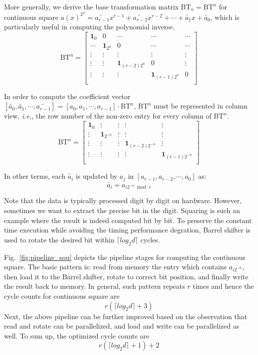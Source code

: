 \documentclass[preprint]{iacrtrans}
\begin{document}
More generally, we derive the base transformation matrix $\text{BT}_n=\text{BT}^n$ for continuous square $a(x)^{2^n}=\widetilde{a_{r-1}}x^{r-1}+\widetilde{a_{r-2}}x^{r-2}+\cdots + \widetilde{a_{1}}x +\widetilde{a_0}$, which is particularly useful in computing the polynomial inverse.
\[
\text{BT}^n =
\left[ \begin{array}{ccccc}
\mathbf{1}_{0}&0&\cdots&\cdots&\cdots  \\
\cdots&\mathbf{1}_{2^n}&0 &\cdots&\cdots \\
\vdots&\vdots&\vdots&\vdots&\vdots\\
\vdots&\vdots&\mathbf{1}_{(r-2)2^n}&0&\vdots\\
\vdots&\vdots&\vdots&\mathbf{1}_{(r-1)2^n}&0\\
\end{array}
\right ]
\]

In order to compute the coefficient vector $[\widetilde{a_{0}},\widetilde{a_{1}},\cdots,\widetilde{a_{r-1}}]=[{a_{0}},{a_{1}},\cdots,{a_{r-1}}]
\cdot \text{BT}^n$, $\text{BT}^n$ must be represented in column view, \textit{i.e.},
the row number of the non-zero entry for every column of $\text{BT}^n$.
\[
\text{BT}^n =
\left[ \begin{array}{ccccc}
\mathbf{1}_{0}&\vdots& \vdots&\vdots&\vdots \\
\vdots&\mathbf{1}_{2^{-n}}&\vdots&\vdots&\vdots\\
\vdots&\vdots&\vdots&\mathbf{1}_{(r-2)2^{-n}}&\vdots\\
\vdots&\vdots&\vdots&\vdots&\mathbf{1}_{(r-1)2^{-n}}\\
\end{array}
\right ]
\]

In other terms, each $\widetilde{a_{i}}$ is updated by $a_{j}$ in $[{a_{r-1}},{a_{r-2}},\cdots,{a_0}]$ as:
\[
    \widetilde{a_{i}} = a_{i2^{-n}\bmod r}
\]

Note that the data is typically processed digit by digit on hardware. However, sometimes we want to extract the precise bit in the digit. Squaring is such an example where the result is indeed computed bit by bit. To preserve the constant time execution while avoiding the timing performance degration, Barrel shifter is used to rotate the desired bit within $\lceil log_2d\rceil$ cycles.

Fig.~\ref{fig:pipeline_squ} depicts the pipeline stages for computing the continuous square. The basic pattern is: read from memory the entry which contains $a_{i2^{-n}}$, then load it to the Barrel shifter, rotate to correct bit position, and finally write the result back to memory. In general, such pattern repeats $r$ times and hence the cycle counts for continuous square are
\[
    r(\lceil log_2d\rceil+3)
\]
Next, the above pipeline can be further improved based on the observation that read and rotate can be parallelized, and load and write can be parallelized as well. To sum up, the optimized cycle counts are
\[
    r(\lceil log_2d\rceil+1)+2
\]
\end{document}
